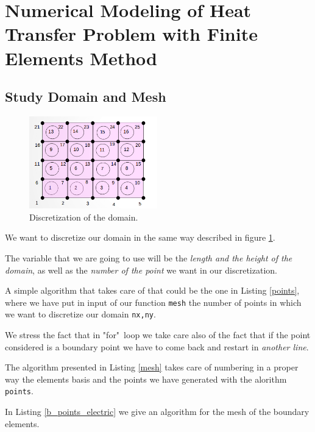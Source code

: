 \section{Numerical Modeling of Heat Transfer Problem with Finite Elements Method}
\subsection{Study Domain and Mesh}
\label{sec:4.1}
\begin{figure}
	\centering
	\includegraphics[height=4cm]{Images/mesh.png}
	\caption{Discretization of the domain.}
	\label{figure:mesh}
\end{figure}
\begin{mdframed}
	We want to discretize our domain in the same way described in figure \ref{figure:mesh}.
	
	The variable that we are going to use will be the \emph{length and the height of the domain}, as well as the \emph{number of the point} we want in our discretization. 
	
	A simple algorithm that takes care of that could be the one in Listing \ref{points}, where we have put in input of our function \texttt{mesh} the number of points in which we want to discretize our domain \texttt{nx,ny}.   
	
	
	
	We stress the fact that in "for"~loop we take care also of the fact that if the point considered is a boundary point we have to come back and restart in \emph{another line}.
	
	The algorithm presented in Listing \ref{mesh} takes care of numbering in a proper way the elements basis and the points we have generated with the alorithm \texttt{points}.
	
	
	In Listing \ref{b_points_electric} we give an algorithm for the mesh of the boundary elements.  
	
\end{mdframed}
